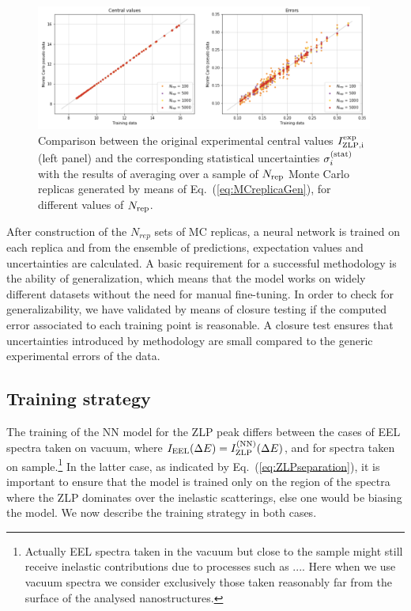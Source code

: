 \begin{figure}[t]
    \centering
    \includegraphics[width=0.99\textwidth]{plots/MC.png}
    \caption{Comparison between the original experimental central values
      $I_{\rm ZLP,i}^{\rm exp}$ (left panel) and the corresponding statistical
      uncertainties $\sigma_i^{(\rm stat)}$ with the results of averaging over
      a sample of $N_{\rm rep}$ Monte Carlo replicas generated by means of
      Eq.~(\ref{eq:MCreplicaGen}), for different values of
      $N_{\rm rep}$.
      }
    \label{fig:MC}
\end{figure}




After construction of the $N_{rep}$ sets of MC replicas, a neural network is
trained on each replica and from the ensemble of predictions, expectation values
and uncertainties are calculated. \newline
%
A basic requirement for a successful methodology is the ability of generalization, 
which means that the model works on widely different datasets without 
the need for manual fine-tuning.
%
In order to check for generalizability, we have validated by means of 
closure testing\cite{Ball:2015oha} if the computed error 
associated to each training point is reasonable. 
%
A closure test ensures that uncertainties introduced by methodology are small 
compared to the generic experimental errors of the data. 
%


\subsection{Training strategy}

The training of the NN model for the ZLP peak differs between
the cases of EEL spectra taken on vacuum, where $I_{\rm EEL}(\Delta E) =I_{\rm ZLP}^{\rm (NN)}(\Delta E)$,
and for spectra taken on sample.\footnote{Actually EEL spectra taken in the vacuum but close
  to the sample might still receive inelastic contributions due to processes such as .... Here
  when we use vacuum spectra we consider exclusively those taken reasonably far from the surface
of the analysed nanostructures.}
%
In the latter case, as indicated by Eq.~(\ref{eq:ZLPseparation}), it is
important to ensure that the model is trained only on the region of the spectra
where the ZLP dominates over the inelastic scatterings, else one would be biasing
the model.
%
We now describe the training strategy in both cases.

